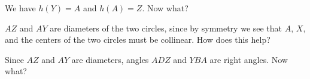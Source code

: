 













We have $h(Y) = A$ and $h(A) = Z$. Now what?


$AZ$ and $AY$ are diameters of the two circles, since by symmetry we see that $A$, $X$, and the centers of the two circles must be collinear. How does this help?




Since $AZ$ and $AY$ are diameters, angles $ADZ$ and $YBA$ are right angles. Now what?

